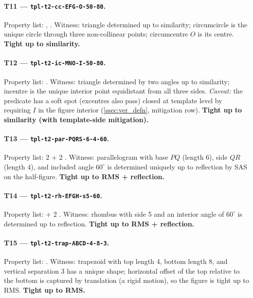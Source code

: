 \paragraph{T11 --- \texttt{tpl-t2-cc-EFG-O-50-80}.}
Property list: , .
Witness: triangle determined up to similarity; circumcircle is the unique circle through three non-collinear points; circumcentre $O$ is its centre.
\textbf{Tight up to similarity.}

\paragraph{T12 --- \texttt{tpl-t2-ic-MNO-I-50-80}.}
Property list: .
Witness: triangle determined by two angles up to similarity; incentre is the unique interior point equidistant from all three sides.
\emph{Caveat:} the predicate has a soft spot (excentres also pass) closed at template level by requiring $I$ in the figure interior (\cref{ssec:ver_defn}, mitigation row).
\textbf{Tight up to similarity (with template-side mitigation).}

\paragraph{T13 --- \texttt{tpl-t2-par-PQRS-6-4-60}.}
Property list: 2  + 2 .
Witness: parallelogram with base $PQ$ (length 6), side $QR$ (length 4), and included angle $60^\circ$ is determined uniquely up to reflection by SAS on the half-figure.
\textbf{Tight up to RMS + reflection.}

\paragraph{T14 --- \texttt{tpl-t2-rh-EFGH-s5-60}.}
Property list:  + 2 .
Witness: rhombus with side 5 and an interior angle of $60^\circ$ is determined up to reflection.
\textbf{Tight up to RMS + reflection.}

\paragraph{T15 --- \texttt{tpl-t2-trap-ABCD-4-8-3}.}
Property list: .
Witness: trapezoid with top length 4, bottom length 8, and vertical separation 3 has a unique shape; horizontal offset of the top relative to the bottom is captured by translation (a rigid motion), so the figure is tight up to RMS.
\textbf{Tight up to RMS.}

